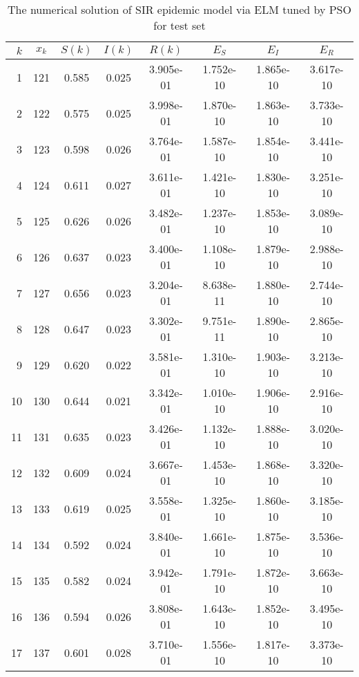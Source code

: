 \begin{table}[ht]
  \caption{The numerical solution of SIR epidemic model via ELM tuned by PSO for test set}
  \centering
  \begin{tabular}{rccccccc}
    $k$ & $x_{k}$ & $S(k)$ & $I(k)$ & $R(k)$ & $E_S$ & $E_I$ & $E_R$\\
    \hline\hline
      1 & 121 &        0.585 &     0.025 & 3.905e-01 & 1.752e-10 & 1.865e-10 &  3.617e-10 \\ 
      2 & 122 &        0.575 &     0.025 & 3.998e-01 & 1.870e-10 & 1.863e-10 &  3.733e-10 \\ 
      3 & 123 &        0.598 &     0.026 & 3.764e-01 & 1.587e-10 & 1.854e-10 &  3.441e-10 \\ 
      4 & 124 &        0.611 &     0.027 & 3.611e-01 & 1.421e-10 & 1.830e-10 &  3.251e-10 \\ 
      5 & 125 &        0.626 &     0.026 & 3.482e-01 & 1.237e-10 & 1.853e-10 &  3.089e-10 \\ 
      6 & 126 &        0.637 &     0.023 & 3.400e-01 & 1.108e-10 & 1.879e-10 &  2.988e-10 \\ 
      7 & 127 &        0.656 &     0.023 & 3.204e-01 & 8.638e-11 & 1.880e-10 &  2.744e-10 \\ 
      8 & 128 &        0.647 &     0.023 & 3.302e-01 & 9.751e-11 & 1.890e-10 &  2.865e-10 \\ 
      9 & 129 &        0.620 &     0.022 & 3.581e-01 & 1.310e-10 & 1.903e-10 &  3.213e-10 \\ 
     10 & 130 &        0.644 &     0.021 & 3.342e-01 & 1.010e-10 & 1.906e-10 &  2.916e-10 \\ 
     11 & 131 &        0.635 &     0.023 & 3.426e-01 & 1.132e-10 & 1.888e-10 &  3.020e-10 \\ 
     12 & 132 &        0.609 &     0.024 & 3.667e-01 & 1.453e-10 & 1.868e-10 &  3.320e-10 \\ 
     13 & 133 &        0.619 &     0.025 & 3.558e-01 & 1.325e-10 & 1.860e-10 &  3.185e-10 \\ 
     14 & 134 &        0.592 &     0.024 & 3.840e-01 & 1.661e-10 & 1.875e-10 &  3.536e-10 \\ 
     15 & 135 &        0.582 &     0.024 & 3.942e-01 & 1.791e-10 & 1.872e-10 &  3.663e-10 \\ 
     16 & 136 &        0.594 &     0.026 & 3.808e-01 & 1.643e-10 & 1.852e-10 &  3.495e-10 \\ 
     17 & 137 &        0.601 &     0.028 & 3.710e-01 & 1.556e-10 & 1.817e-10 &  3.373e-10 \\ 

\end{tabular}
\end{table}
